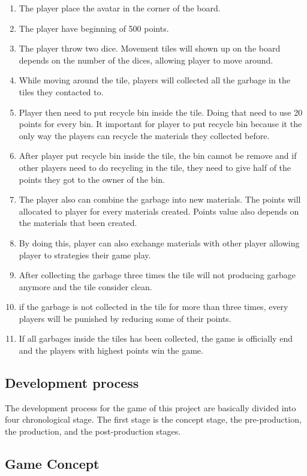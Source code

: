\documentclass[12pt]{article}
\begin{document}
\begin{enumerate}
    \item The player place the avatar in the corner of the board.
    \item The player have beginning of 500 points.
    \item The player throw two dice. Movement tiles will shown up on the board depends on the number of the dices, allowing player to move around.
    \item While moving around the tile, players will collected all the garbage in the tiles they contacted to. 
    \item Player then need to put recycle bin inside the tile. Doing that need to use 20 points for every bin. It important for player to put recycle bin because it the only way the players can recycle the materials they collected before. 
    \item After player put recycle bin inside the tile, the bin cannot be remove and if other players need to do recycling in the tile, they need to give half of the points they got to the owner of the bin.
    \item The player also can combine the garbage into new materials. The points will allocated to player for every materials created. Points value also depends on the materials that been created.
    \item By doing this, player can also exchange materials with other player allowing player to strategies their game play.
    \item After collecting the garbage three times the tile will not producing garbage anymore and the tile consider clean.
    \item if the garbage is not collected in the tile for more than three times, every players will be punished by reducing some of their points. 
    \item If all garbages inside the tiles has been collected, the game is officially end and the players with highest points win the game.
\end{enumerate}

\subsection{Development process}
The development process for the game of this project are basically divided into four chronological stage. The first stage is the concept stage, the pre-production, the production, and the post-production stages. 
\subsection{Game Concept}
\end{document}

